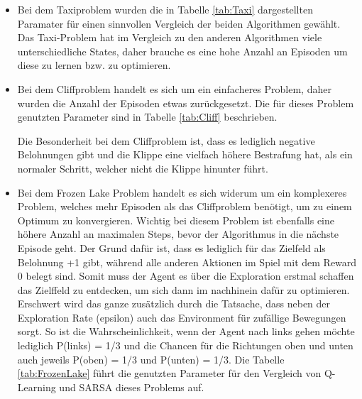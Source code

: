 \begin{itemize}
    \item Bei dem Taxiproblem wurden die in Tabelle \ref{tab:Taxi} dargestellten Paramater für einen sinnvollen Vergleich der beiden Algorithmen gewählt. Das Taxi-Problem hat im Vergleich zu den anderen Algorithmen viele unterschiedliche States, daher brauche es eine hohe Anzahl an Episoden um diese zu lernen bzw. zu optimieren.
    
    \item Bei dem Cliffproblem handelt es sich um ein einfacheres Problem, daher wurden die Anzahl der Episoden etwas zurückgesetzt. Die für dieses Problem genutzten Parameter sind in Tabelle \ref{tab:Cliff} beschrieben.
    
    Die Besonderheit bei dem Cliffproblem ist, dass es lediglich negative Belohnungen gibt und die Klippe eine vielfach höhere Bestrafung hat, als ein normaler Schritt, welcher nicht die Klippe hinunter führt. 

    \item Bei dem Frozen Lake Problem handelt es sich widerum um ein komplexeres Problem, welches mehr Episoden als das Cliffproblem benötigt, um zu einem Optimum zu konvergieren. Wichtig bei diesem Problem ist ebenfalls eine höhere Anzahl an maximalen Steps, bevor der Algorithmus in die nächste Episode geht. 
    Der Grund dafür ist, dass es lediglich für das Zielfeld als Belohnung +1 gibt, während alle anderen Aktionen im Spiel mit dem Reward 0 belegt sind. Somit muss der Agent es über die Exploration erstmal schaffen das Zielffeld zu entdecken, um sich dann im nachhinein dafür zu optimieren. 
    Erschwert wird das ganze zusätzlich durch die Tatsache, dass neben der Exploration Rate (epsilon) auch das Environment für zufällige Bewegungen sorgt. So ist die Wahrscheinlichkeit, wenn der Agent nach links gehen möchte lediglich P(links) = 1/3 und die Chancen für die Richtungen oben und unten auch jeweils P(oben) = 1/3 und P(unten) = 1/3. 
    Die Tabelle \ref{tab:FrozenLake} führt die genutzten Parameter für den Vergleich von Q-Learning und SARSA dieses Problems auf.
   

\end{itemize}
